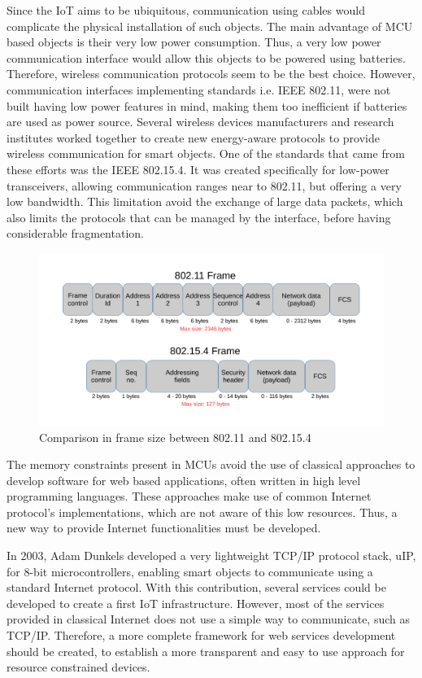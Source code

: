Since the IoT aims to be ubiquitous, communication using cables would complicate the physical installation of such objects.
The main advantage of MCU based objects is their very low power consumption.
Thus, a very low power communication interface would allow this objects to be powered using batteries.
Therefore, wireless communication protocols seem to be the best choice.
However, communication interfaces implementing standards i.e. IEEE 802.11, were not built having low power features in mind, making them too inefficient if batteries are used as power source.
Several wireless devices manufacturers and research institutes worked together to create new energy-aware protocols to provide wireless communication for smart objects.
One of the standards that came from these efforts was the IEEE 802.15.4\cite{ieee802.15.4}.
It was created specifically for low-power transceivers, allowing communication ranges near to 802.11, but offering a very low bandwidth.
This limitation avoid the exchange of large data packets, which also limits the protocols that can be managed by the interface, before having considerable fragmentation.

\begin{figure}[htb]
	\centering
	\includegraphics[width=1\columnwidth]{chapters/background.images/FramesComparison.pdf}
	\caption{Comparison in frame size between 802.11 and 802.15.4}
	\label{fig:FramesComparison}
\end{figure}

The memory constraints present in MCUs avoid the use of classical approaches to develop software for web based applications, often written in high level programming languages.
These approaches make use of common Internet protocol's implementations, which are not aware of this low resources.
Thus, a new way to provide Internet functionalities must be developed.

In 2003, Adam Dunkels developed a very lightweight TCP/IP protocol stack, uIP\cite{dunkels03full}, for 8-bit microcontrollers, enabling smart objects to communicate using a standard Internet protocol.
With this contribution, several services could be developed to create a first IoT infrastructure.
However, most of the services provided in classical Internet does not use a simple way to communicate, such as TCP/IP.
Therefore, a more complete framework for web services development should be created, to establish a more transparent and easy to use approach for resource constrained devices.

